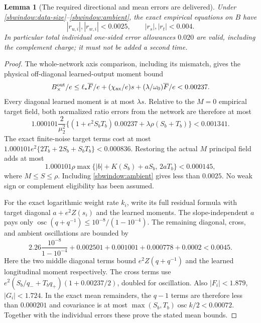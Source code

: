 \documentclass{article} %
\theoremstyle{plain}
\newtheorem{lemma}[theorem]{Lemma}
\theoremstyle{definition}
\theoremstyle{remark}
\begin{document}
\begin{lemma}[The required directional and mean errors are delivered]
\label{sbwindow:errors}
Under \eqref{sbwindow:data-size}--\eqref{sbwindow:ambient}, the exact
empirical equations on $B$ have
\[
 |r_{u,i}|,|r_{w,i}|<0.0025,\qquad |r_s|,|r_t|<0.004.
\]
In particular total individual one-sided error allowances $0.020$ are
valid, including the complement charge; it must not be added a second time.
\end{lemma}
\begin{proof}
The whole-network axis comparison, including its mismatch, gives the
physical off-diagonal learned-output moment bound
\[
 B_\times^{\rm out}/e\le
 \ell_*\overline F/e+(\chi_{\rm ax}/e)s
                   +(\lambda/\omega_0)\overline F/e<0.00237.
\]
Every diagonal learned moment is at most $\lambda s$. Relative to the
$M=0$ empirical target field, both normalized ratio errors from the
network are therefore at most
\[
 1.000101\frac2{\mu_2^2}
 \{(1+e^2S_bT_b)\,0.00237+\lambda\rho(S_b+T_b)\}<0.001341.
\]
The exact finite-noise target terms cost at most
$1.000101e^2\{2T_b+2S_b+S_bT_b\}<0.000836$.
Restoring the actual $M$ principal field adds at most
\[
 1.000101\rho\max\{|b|+K(S_b)+aS_b,\,2aT_b\}<0.000145,
\]
where $M\le S\le\rho$. Including \eqref{sbwindow:ambient} gives less
than $0.0025$. No weak sign or complement eligibility has been assumed.

For the exact logarithmic weight rate $k_i$, write its full residual
formula with target diagonal $a+e^2Z(s_i)$ and the learned moments.
The slope-independent $a$ pays only
$\operatorname{osc}(q+q^{-1})\le10^{-8}/(1-10^{-4})$.
The remaining diagonal, cross, and ambient oscillations are bounded by
\[
 2.26\frac{10^{-8}}{1-10^{-4}}+0.002501+0.001001+0.000778+0.0002
 <0.0045.
\]
Here the two middle diagonal terms bound $e^2Z(q+q^{-1})$ and the learned
longitudinal moment respectively. The cross terms use
$e^2(S_b/q_-+T_bq_+)(1+0.00237/2)$, doubled for oscillation.
Also $|F_i|<1.879$, $|G_i|<1.724$. In the exact mean remainders, the
$q-1$ terms are therefore less than $0.000201$ and covariance is at most
$\max(S_b,T_b)\operatorname{osc}k/2<0.00072$.
Together with the individual errors these prove the stated mean bounds.
\end{proof}
\end{document}
